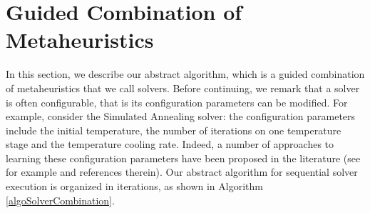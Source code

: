 \section{Guided Combination of Metaheuristics} \label{sec:combination}
In this section, we describe our abstract algorithm, which is a guided combination of metaheuristics that we call solvers. Before continuing, we remark that a solver is often configurable, that is its configuration parameters can be modified. For example, consider the Simulated Annealing solver: the configuration parameters include the initial temperature, the number of iterations on one temperature stage and the temperature cooling rate. Indeed, a number of approaches to learning these configuration parameters have been proposed in the literature (see for example \cite{HutHooLey11-smac} and references therein). %
Our abstract algorithm for sequential solver execution is organized in iterations, as shown in Algorithm \ref{algoSolverCombination}. 



